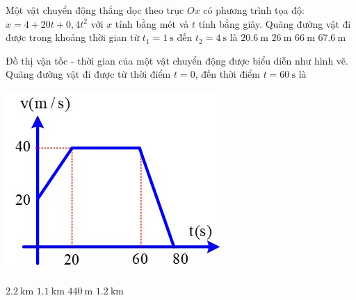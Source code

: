 \begin{ex}
	Một vật chuyển động thẳng dọc theo trục $Ox$ có phương trình tọa độ: $x=4+20t+0,4t^2$ với $x$ tính bằng mét và $t$ tính bằng giây. Quãng đường vật đi được trong khoảng thời gian từ $t_1=\SI{1}{\second}$ đến $t_2=\SI{4}{\second}$ là
	\choice
	{$\SI{20.6}{\meter}$}
	{$\SI{26}{\meter}$}
	{\True $\SI{66}{\meter}$}
	{$\SI{67.6}{\meter}$}
	\loigiai{}
\end{ex}
\begin{ex}
	Đồ thị vận tốc - thời gian của một vật chuyển động được biểu diễn như hình vẽ. Quãng đường vật đi được từ thời điểm $t = 0$, đến thời điểm $t = \SI{60}{\second}$ là
	\begin{center}
		\includegraphics[width=0.3\linewidth]{figs/G10-BTTHEMPTCD-1}
	\end{center}
	\choice
	{\True $\SI{2.2}{\kilo\meter}$}
	{$\SI{1.1}{\kilo\meter}$}
	{$\SI{440}{\meter}$}
	{$\SI{1.2}{\kilo\meter}$}
	\loigiai{}
\end{ex}

